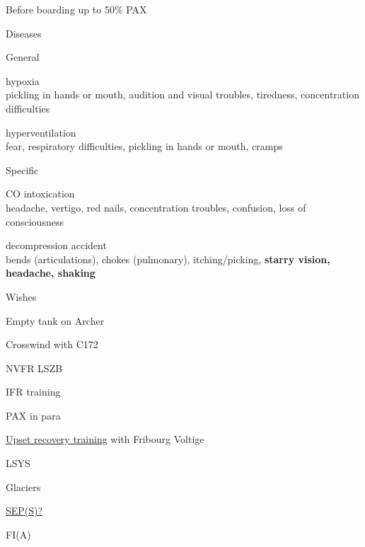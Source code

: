 \documentclass{checklists}
\begin{document}
\vspace{5mm}
\begin{CheckListRule}{Before boarding}{}%
	\vspace{2mm}
			{up to 50\% PAX}
\end{CheckListRule}%
\vfill
\begin{SubWrapper}{Diseases}{}%
	\vspace{5mm}
\begin{SubCheckList}{General}{}%
	\item hypoxia\\\phantom{boooo}
		pickling in hands or mouth, audition and visual troubles, tiredness, concentration difficulties
	\item hyperventilation\\\phantom{boooo}
		fear, respiratory difficulties, pickling in hands or mouth, cramps
\end{SubCheckList}%
\begin{SubCheckList}{Specific}%
	\item CO intoxication\\\phantom{boooo}
		headache, vertigo, red nails, concentration troubles, confusion, loss of consciousness
	\item decompression accident\\\phantom{boooo}
		bends (articulations), chokes (pulmonary), itching/picking, \textbf{starry vision, headache, shaking}
\end{SubCheckList}%
\end{SubWrapper}%
\SkipPage
\begin{CheckListRule}{Wishes}{}%
\renewcommand{\labelenumi}{\Square}
	\item Empty tank on Archer
	\item Crosswind with C172
	\item NVFR LSZB
	\item IFR training
	\item PAX in para
	\item \href{http://www.fribourg-voltige.ch/Activlites.htm}{Upset recovery
		training} with Fribourg Voltige
	\item LSYS
	\item Glaciers
	\item \href{http://fr.seaplanes.ch/}{SEP(S)?}
	\item FI(A)
\end{CheckListRule}
\end{document}
